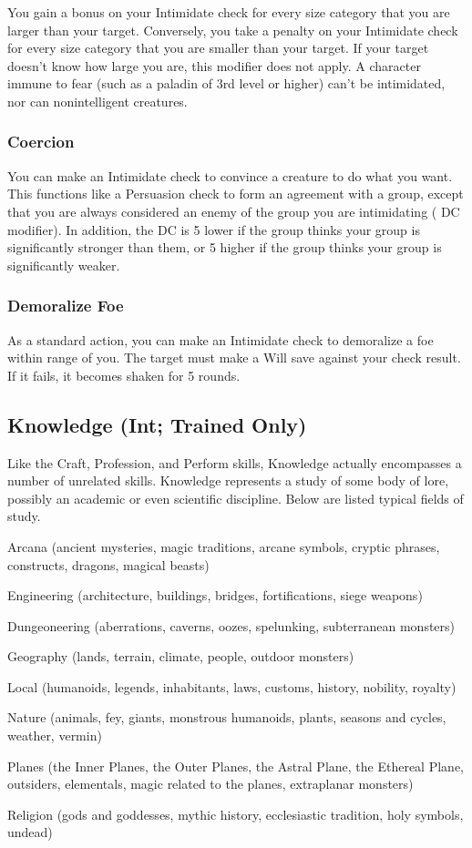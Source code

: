 You gain a  bonus on your Intimidate check for every size category that you are larger than your target. Conversely, you take a  penalty on your Intimidate check for every size category that you are smaller than your target. If your target doesn't know how large you are, this modifier does not apply. A character immune to fear (such as a paladin of 3rd level or higher) can't be intimidated, nor can nonintelligent creatures.

\subsubsection{Coercion}
You can make an Intimidate check to convince a creature to do what you want. This functions like a Persuasion check to form an agreement with a group, except that you are always considered an enemy of the group you are intimidating ( DC modifier). In addition, the DC is 5 lower if the group thinks your group is significantly stronger than them, or 5 higher if the group thinks your group is significantly weaker.

\subsubsection{Demoralize Foe}
As a standard action, you can make an Intimidate check to demoralize a foe within \rngmed range of you. The target must make a Will save against your check result. If it fails, it becomes shaken for 5 rounds.

\subsection{Knowledge (Int; Trained Only)}\label{Knowledge (Int; Trained Only)}
Like the Craft, Profession, and Perform skills, Knowledge actually encompasses a number of unrelated skills. Knowledge represents a study of some body of lore, possibly an academic or even scientific discipline. Below are listed typical fields of study.
\begin{itemize*}
\item Arcana (ancient mysteries, magic traditions, arcane symbols,
cryptic phrases, constructs, dragons, magical beasts)
\item Engineering (architecture, buildings, bridges, fortifications, siege weapons)
\item Dungeoneering (aberrations, caverns, oozes, spelunking, subterranean monsters)
\item Geography (lands, terrain, climate, people, outdoor monsters)
\item Local (humanoids, legends, inhabitants, laws, customs, history, nobility, royalty)
\item Nature (animals, fey, giants, monstrous humanoids, plants, seasons and cycles, weather, vermin)
\item Planes (the Inner Planes, the Outer Planes, the Astral Plane,
the Ethereal Plane, outsiders, elementals, magic related to the planes, extraplanar monsters)
\item Religion (gods and goddesses, mythic history, ecclesiastic tradition, holy symbols, undead)
\end{itemize*}

